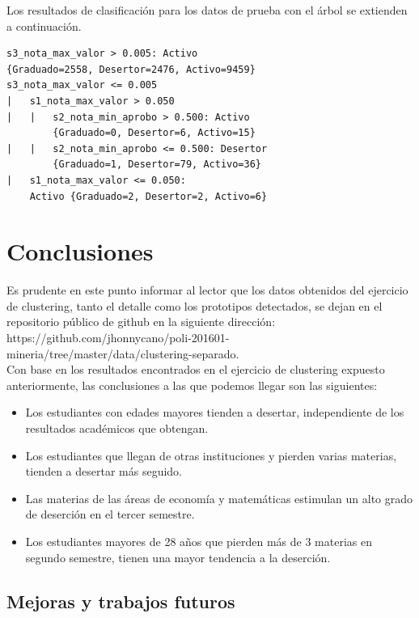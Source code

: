 \documentclass[fleqn,10pt]{SelfArx} %
\begin{document}
Los resultados de clasificación para los datos de prueba con el árbol se extienden a continuación.

\begin{verbatim}
s3_nota_max_valor > 0.005: Activo 
{Graduado=2558, Desertor=2476, Activo=9459}
s3_nota_max_valor <= 0.005
|   s1_nota_max_valor > 0.050
|   |   s2_nota_min_aprobo > 0.500: Activo 
        {Graduado=0, Desertor=6, Activo=15}
|   |   s2_nota_min_aprobo <= 0.500: Desertor 
        {Graduado=1, Desertor=79, Activo=36}
|   s1_nota_max_valor <= 0.050: 
    Activo {Graduado=2, Desertor=2, Activo=6}
\end{verbatim}

 
\section{Conclusiones}

Es prudente en este punto informar al lector que los datos obtenidos del ejercicio de clustering, tanto el detalle como los prototipos detectados, se dejan en el repositorio público de github en la siguiente dirección:\\

https://github.com/jhonnycano/poli-201601-mineria/tree/master/data/clustering-separado.
\\

Con base en los resultados encontrados en el ejercicio de clustering expuesto anteriormente, las conclusiones a las que podemos llegar son las siguientes:

\begin{itemize}
	\item Los estudiantes con edades mayores tienden a desertar, independiente de los resultados académicos que obtengan.
	\item Los estudiantes que llegan de otras instituciones y pierden varias materias, tienden a desertar más seguido.
	\item Las materias de las áreas de economía y matemáticas estimulan un alto grado de deserción en el tercer semestre.
	\item Los estudiantes mayores de 28 años que pierden más de 3 materias en segundo semestre, tienen una mayor tendencia a la deserción.
\end{itemize}

\subsection{Mejoras y trabajos futuros}
\end{document}
